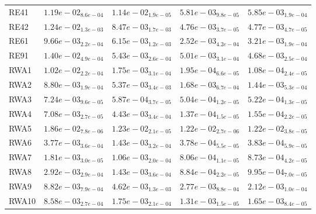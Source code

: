 \documentclass{article}
\begin{document}
\begin{table}
\begin{scriptsize}
\begin{tabular}{lllll}
RE41 & $  1.19e-02_{ 8.6e-04}$ & $  1.14e-02_{ 1.9e-05}$ & \cellcolor{gray95}$  5.81e-03_{ 9.8e-05}$ & \cellcolor{gray25}$  5.85e-03_{ 1.9e-04}$ \\
RE42 & $  1.24e-02_{ 1.3e-03}$ & $  8.47e-03_{ 1.7e-03}$ & \cellcolor{gray95}$  4.76e-03_{ 3.7e-05}$ & \cellcolor{gray25}$  4.77e-03_{ 4.7e-05}$ \\
RE61 & $  9.66e-03_{ 2.2e-04}$ & $  6.15e-03_{ 1.2e-03}$ & \cellcolor{gray95}$  2.52e-03_{ 4.2e-04}$ & \cellcolor{gray25}$  3.21e-03_{ 1.9e-04}$ \\
RE91 & $  1.40e-02_{ 4.9e-04}$ & $  5.43e-03_{ 2.6e-04}$ & \cellcolor{gray25}$  5.01e-03_{ 3.1e-04}$ & \cellcolor{gray95}$  4.68e-03_{ 2.5e-04}$ \\
RWA1 & $  1.02e-02_{ 2.2e-04}$ & $  1.75e-03_{ 3.1e-04}$ & \cellcolor{gray25}$  1.95e-04_{ 6.6e-05}$ & \cellcolor{gray95}$  1.08e-04_{ 2.4e-05}$ \\
RWA2 & $  8.80e-03_{ 1.9e-04}$ & $  5.37e-03_{ 3.4e-03}$ & \cellcolor{gray25}$  1.68e-03_{ 6.7e-04}$ & \cellcolor{gray95}$  1.44e-03_{ 5.3e-04}$ \\
RWA3 & $  7.24e-03_{ 9.6e-05}$ & $  5.87e-04_{ 3.7e-05}$ & \cellcolor{gray95}$  5.04e-04_{ 1.2e-05}$ & \cellcolor{gray25}$  5.22e-04_{ 1.3e-05}$ \\
RWA4 & $  7.08e-03_{ 2.7e-05}$ & $  4.43e-03_{ 3.4e-04}$ & \cellcolor{gray95}$  1.37e-04_{ 1.5e-05}$ & \cellcolor{gray25}$  1.55e-04_{ 2.2e-05}$ \\
RWA5 & $  1.86e-02_{ 7.8e-06}$ & $  1.23e-02_{ 2.1e-05}$ & \cellcolor{gray95}$  1.22e-02_{ 2.7e-06}$ & \cellcolor{gray25}$  1.22e-02_{ 3.8e-05}$ \\
RWA6 & $  3.77e-03_{ 3.6e-04}$ & $  1.43e-03_{ 3.2e-04}$ & \cellcolor{gray95}$  3.78e-04_{ 5.5e-05}$ & \cellcolor{gray25}$  3.83e-04_{ 5.9e-05}$ \\
RWA7 & $  1.81e-03_{ 3.0e-05}$ & $  1.06e-03_{ 2.0e-04}$ & \cellcolor{gray95}$  8.06e-04_{ 1.1e-05}$ & \cellcolor{gray25}$  8.73e-04_{ 4.2e-05}$ \\
RWA8 & $  2.92e-03_{ 2.9e-04}$ & $  1.43e-03_{ 3.6e-04}$ & \cellcolor{gray95}$  8.84e-04_{ 2.2e-05}$ & \cellcolor{gray25}$  9.95e-04_{ 7.0e-05}$ \\
RWA9 & $  8.82e-03_{ 7.9e-04}$ & $  4.62e-03_{ 1.3e-03}$ & \cellcolor{gray25}$  2.77e-03_{ 8.8e-04}$ & \cellcolor{gray95}$  2.12e-03_{ 1.0e-04}$ \\
RWA10 & $  8.58e-03_{ 2.7e-04}$ & $  1.75e-03_{ 2.1e-04}$ & \cellcolor{gray95}$  1.31e-03_{ 1.5e-05}$ & \cellcolor{gray25}$  1.65e-03_{ 8.4e-05}$ \\
\hline
\end{tabular}
\end{scriptsize}
\end{table}
\end{document}
